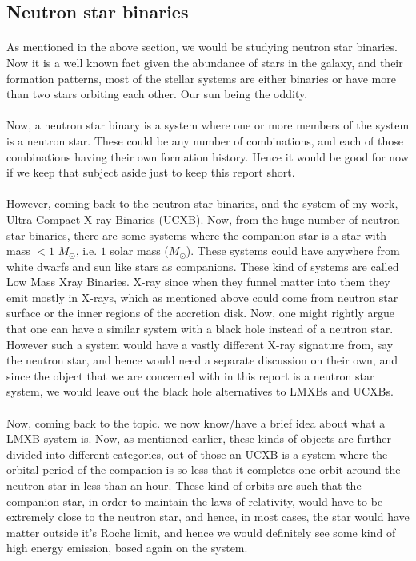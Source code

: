 \documentclass[a4paper,twoside]{report}
\numberwithin{equation}{section}
\begin{document}
\subsection{Neutron star binaries}
\paragraph{}
As mentioned in the above section, we would be studying neutron star binaries. Now it is a well known fact given the abundance of stars in the galaxy, and their formation patterns, most of the stellar systems are either binaries or have more than two stars orbiting each other. Our sun being the oddity. 
\paragraph{}
Now, a neutron star binary is a system where one or more members of the system is a neutron star. These could be any number of combinations, and each of those combinations having their own formation history. Hence it would be good for now if we keep that subject aside just to keep this report short. 
\paragraph{}
However, coming back to the neutron star binaries, and the system of my work, Ultra Compact X-ray Binaries (UCXB). Now, from the huge number of neutron star binaries, there are some systems where the companion star is a star with mass $<1$ \(M_\odot\), i.e. $1$ solar mass (\(M_\odot\)). These systems could have anywhere from white dwarfs and sun like stars as companions. These kind of systems are called Low Mass Xray Binaries. X-ray since when they funnel matter into them they emit mostly in X-rays, which as mentioned above could come from neutron star surface or the inner regions of the accretion disk. Now, one might rightly argue that one can have a similar system with a black hole instead of a neutron star. However such a system would have a vastly different X-ray signature from, say the neutron star, and hence would need a separate discussion on their own, and since the object that we are concerned with in this report is a neutron star system, we would leave out the black hole alternatives to LMXBs and UCXBs. 
\paragraph{}
Now, coming back to the topic. we now know/have a brief idea about what a LMXB system is. Now, as mentioned earlier, these kinds of objects are further divided into different categories, out of those an UCXB is a system where the orbital period of the companion is so less that it completes one orbit around the neutron star in less than an hour. These kind of orbits are such that the companion star, in order to maintain the laws of relativity, would have to be extremely close to the neutron star, and hence, in most cases, the star would have matter outside it's Roche limit, and hence we would definitely see some kind of high energy emission, based again on the system. 
\end{document}
